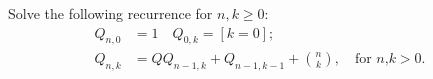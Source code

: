 \documentclass{article}
\begin{document}
Solve the following recurrence for $ n,k\geq 0 $:
\begin{align*}
Q_{n,0} &= 1 \quad Q_{0,k} = [k=0]; \\
Q_{n,k} &= Q Q_{n-1,k}+Q_{n-1,k-1}+\binom{n}{k},
 \quad\text{for $n$,$k>0$.}
\end{align*}
\end{document}
